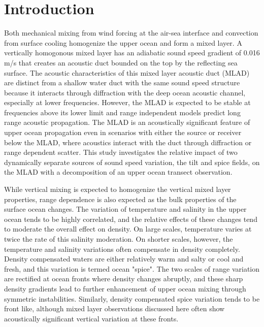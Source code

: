 \documentclass[preprint,NumberedRefs]{JASA}
\begin{document}
\section{\label{sec:intro} Introduction}
Both mechanical mixing from wind forcing at the air-sea interface and convection from surface cooling homogenize the upper ocean and form a mixed layer\citep{cole2010seasonal}. A vertically homogonous mixed layer has an adiabatic sound speed gradient of 0.016 m/s that creates an acoustic duct bounded on the top by the reflecting sea surface. The acoustic characteristics of this mixed layer acoustic duct (MLAD) are distinct from a shallow water duct with the same sound speed structure because it interacts through diffraction with the deep ocean acoustic channel\citep{porter93}, especially at lower frequencies. However, the MLAD is expected to be stable at frequencies above its lower limit\citep{Urick1982Prop} and range independent models predict long range acoustic propagation. The MLAD is an acoustically significant feature of upper ocean propagation even in scenarios with either the source or receiver below the MLAD, where acoustics interact with the duct through diffraction or range dependent scatter\citep{colosi21}. This study investigates the relative impact of two dynamically separate sources of sound speed variation, the tilt and spice fields, on the MLAD with a decomposition of an upper ocean transect observation.

While vertical mixing is expected to homogenize the vertical mixed layer properties, range dependence is also expected as the bulk properties of the surface ocean changes\citep{ferrari2000}. The variation of temperature and salinity in the upper ocean tends to be highly correlated, and the relative effects of these changes tend to moderate the overall effect on density. On large scales, temperature varies at twice the rate of this salinity moderation. On shorter scales, however, the temperature and salinity variations often compensate in density completely. Density compensated waters are either relatively warm and salty or cool and fresh, and this variation is termed ocean "spice"\citep{munk1981evolution}. The two scales of range variation are rectified at ocean fronts where density changes abruptly, and these sharp density gradients lead to further enhancement of upper ocean mixing through symmetric instabilities\citep{dasaro2011}. Similarly, density compensated spice variation tends to be front like, although mixed layer observations discussed here often show acoustically significant vertical variation at these fronts.
\end{document}
